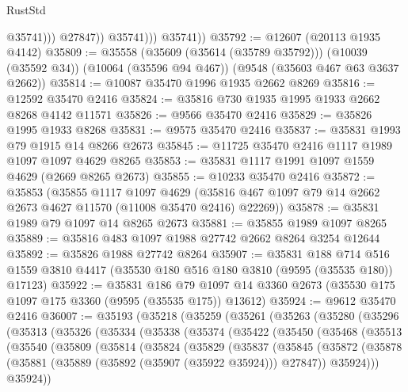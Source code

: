 \begin{lexlean}{RustStd}
\begin{coremodule}
                        @35741)))
                  @27847))
              @35741)))
        @35741))
@35792 := @12607 (@20113 @1935 @4142)
@35809 := @35558
    (@35609 (@35614 (@35789 @35792)))
    (@10039 (@35592 @34))
    (@10064 (@35596 @94 @467))
    (@9548 (@35603 @467 @63 @3637 @2662))
@35814 := @10087 @35470 @1996 @1935 @2662 @8269
@35816 := @12592 @35470 @2416
@35824 := @35816 @730 @1935 @1995 @1933 @2662 @8268 @4142 @11571
@35826 := @9566 @35470 @2416
@35829 := @35826 @1995 @1933 @8268
@35831 := @9575 @35470 @2416
@35837 := @35831 @1993 @79 @1915 @14 @8266 @2673
@35845 := @11725 @35470 @2416 @1117 @1989 @1097 @1097 @4629 @8265
@35853 := @35831 @1117 @1991 @1097 @1559 @4629 (@2669 @8265 @2673)
@35855 := @10233 @35470 @2416
@35872 := @35853
    (@35855
      @1117
      @1097
      @4629
      (@35816 @467 @1097 @79 @14 @2662 @2673 @4627 @11570 (@11008 @35470 @2416) @22269))
@35878 := @35831 @1989 @79 @1097 @14 @8265 @2673
@35881 := @35855 @1989 @1097 @8265
@35889 := @35816 @483 @1097 @1988 @27742 @2662 @8264 @3254 @12644
@35892 := @35826 @1988 @27742 @8264
@35907 := @35831
    @188
    @714
    @516
    @1559
    @3810
    @4417
    (@35530 @180 @516 @180 @3810 (@9595 (@35535 @180)) @17123)
@35922 := @35831
    @186
    @79
    @1097
    @14
    @3360
    @2673
    (@35530 @175 @1097 @175 @3360 (@9595 (@35535 @175)) @13612)
@35924 := @9612 @35470 @2416
@36007 := @35193
    (@35218
      (@35259
        (@35261
          (@35263
            (@35280
              (@35296
                (@35313
                  (@35326
                    (@35334
                      (@35338
                        (@35374
                          (@35422
                            (@35450
                              (@35468
                                (@35513
                                  (@35540
                                    (@35809
                                      (@35814
                                        (@35824
                                          (@35829
                                            (@35837
                                              (@35845
                                                (@35872
                                                  (@35878
                                                    (@35881
                                                      (@35889
                                                        (@35892 (@35907 (@35922 @35924)))
                                                        @27847))
                                                    @35924)))
                                              @35924))

\end{coremodule}
\end{lexlean}
